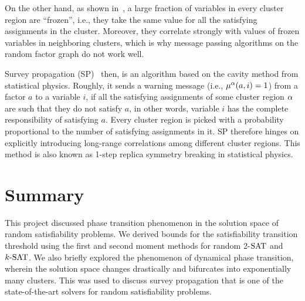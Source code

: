 \documentclass[letterpaper, 10pt, twocolumn, reqno]{amsart}
\begin{document}
On the other hand, as shown in~\cite{achlioptas2006solution}, a large fraction of variables in every cluster region are ``frozen'', i.e., they take the same value for all the satisfying assignments in the cluster. Moreover, they correlate strongly with values of frozen variables in neighboring clusters, which is why message passing algorithms on the random factor graph do not work well.

Survey propagation (SP)~\cite{braunstein2005survey} then, is an algorithm based on the cavity method from statistical physics. Roughly, it sends a warning message (i.e., $\mu^\alpha(a, i) = 1$) from a factor $a$ to a variable $i$, if all the satisfying assignments of some cluster region $\alpha$ are such that they do not satisfy $a$, in other words, variable $i$ has the complete responsibility of satisfying $a$. Every cluster region is picked with a probability proportional to the number of satisfying assignments in it. SP therefore hinges on explicitly introducing long-range correlations among different cluster regions. This method is also known as 1-step replica symmetry breaking in statistical physics.

\section{Summary}
\label{sec:summary}

This project discussed phase transition phenomenon in the solution space of random satisfiability problems. We derived bounds for the satisfiability transition threshold using the first and second moment methods for random 2-$\textrm{SAT}$ and $k\textrm{-SAT}$. We also briefly explored the phenomenon of dynamical phase transition, wherein the solution space changes drastically and bifurcates into exponentially many clusters. This was used to discuss survey propagation that is one of the state-of-the-art solvers for random satisfiability problems.


{
\small


}
\end{document}
